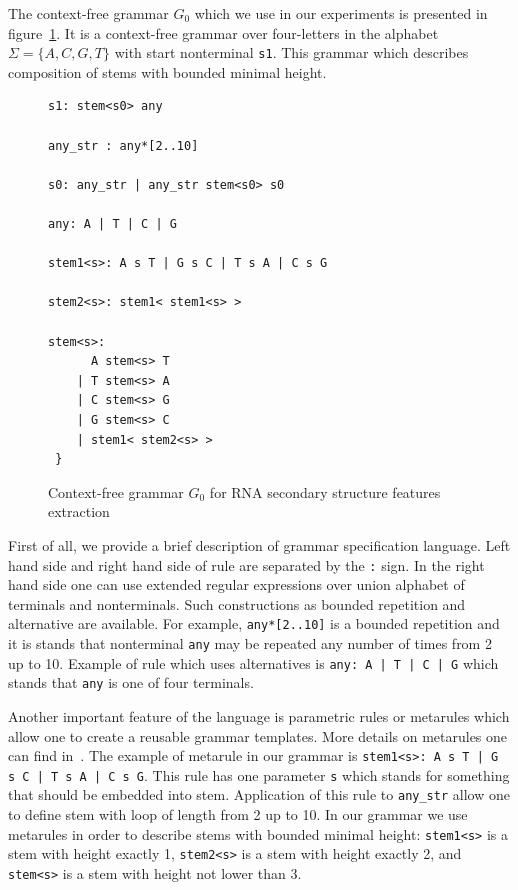 \documentclass[a4paper,twoside]{article}
\begin{document}
The context-free grammar $G_0$ which we use in our experiments is presented in figure~\ref{fig:cfg-rna}.
It is a context-free grammar over four-letters in the alphabet $\Sigma=\{A,C,G,T\}$ with start nonterminal \verb|s1|.
This grammar which describes composition of stems with bounded minimal height.

\begin{figure}
\begin{verbatim}
s1: stem<s0> any

any_str : any*[2..10]

s0: any_str | any_str stem<s0> s0

any: A | T | C | G

stem1<s>: A s T | G s C | T s A | C s G 

stem2<s>: stem1< stem1<s> >

stem<s>:  
      A stem<s> T 
    | T stem<s> A 
    | C stem<s> G 
    | G stem<s> C 
    | stem1< stem2<s> >  
 } 
\end{verbatim}
\caption{Context-free grammar $G_0$ for RNA secondary structure features extraction}
\label{fig:cfg-rna}
\end{figure}

First of all, we provide a brief description of grammar specification language.
Left hand side and right hand side of rule are separated by the \verb|:| sign.
In the right hand side one can use extended regular expressions over union alphabet of terminals and nonterminals.
Such constructions as bounded repetition and alternative are available.
For example, \verb|any*[2..10]| is a bounded repetition and it is stands that nonterminal \verb|any| may be repeated any number of times from 2 up to 10.
Example of rule which uses alternatives is \texttt{any: A | T | C | G} which stands that \verb|any| is one of four terminals.

Another important feature of the language is parametric rules or metarules which allow one to create a reusable grammar templates.
More details on metarules one can find in~\cite{!!!}.
The example of metarule in our grammar is \texttt{stem1<s>: A s T | G s C | T s A | C s G}.
This rule has one parameter \verb|s| which stands for something that should be embedded into stem.
Application of this rule to \verb|any_str| allow one to define stem with loop of length from 2 up to 10.
In our grammar we use metarules in order to describe stems with bounded minimal height: \verb|stem1<s>| is a stem with height exactly 1,  \verb|stem2<s>| is a stem with height exactly 2, and \verb|stem<s>| is a stem with height not lower than 3.
\end{document}
